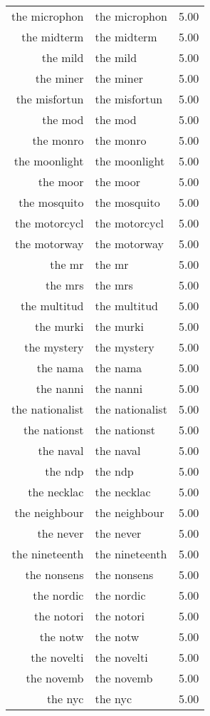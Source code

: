 \begin{table}[ht]
\begin{tabular}{rlr}
  the microphon & the microphon & 5.00 \\ 
  the midterm & the midterm & 5.00 \\ 
  the mild & the mild & 5.00 \\ 
  the miner & the miner & 5.00 \\ 
  the misfortun & the misfortun & 5.00 \\ 
  the mod & the mod & 5.00 \\ 
  the monro & the monro & 5.00 \\ 
  the moonlight & the moonlight & 5.00 \\ 
  the moor & the moor & 5.00 \\ 
  the mosquito & the mosquito & 5.00 \\ 
  the motorcycl & the motorcycl & 5.00 \\ 
  the motorway & the motorway & 5.00 \\ 
  the mr & the mr & 5.00 \\ 
  the mrs & the mrs & 5.00 \\ 
  the multitud & the multitud & 5.00 \\ 
  the murki & the murki & 5.00 \\ 
  the mystery & the mystery & 5.00 \\ 
  the nama & the nama & 5.00 \\ 
  the nanni & the nanni & 5.00 \\ 
  the nationalist & the nationalist & 5.00 \\ 
  the nationst & the nationst & 5.00 \\ 
  the naval & the naval & 5.00 \\ 
  the ndp & the ndp & 5.00 \\ 
  the necklac & the necklac & 5.00 \\ 
  the neighbour & the neighbour & 5.00 \\ 
  the never & the never & 5.00 \\ 
  the nineteenth & the nineteenth & 5.00 \\ 
  the nonsens & the nonsens & 5.00 \\ 
  the nordic & the nordic & 5.00 \\ 
  the notori & the notori & 5.00 \\ 
  the notw & the notw & 5.00 \\ 
  the novelti & the novelti & 5.00 \\ 
  the novemb & the novemb & 5.00 \\ 
  the nyc & the nyc & 5.00 \\ 

\end{tabular}
\end{table}
